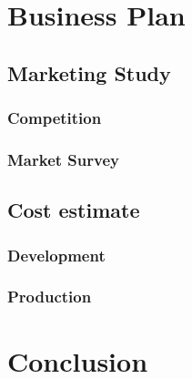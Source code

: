 \documentclass{article}
\begin{document}
\section{Business Plan}
    \subsection{Marketing Study}
        \subsubsection{Competition}
        \subsubsection{Market Survey}
    \subsection{Cost estimate}
        \subsubsection{Development}
        \subsubsection{Production}

\section{Conclusion}

\newpage




\end{document}
